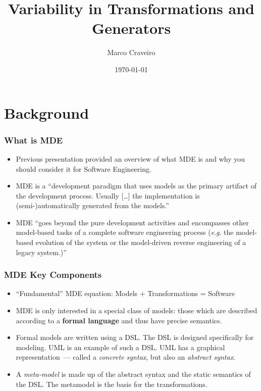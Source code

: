 \documentclass{beamer}
\title{Variability in Transformations and Generators}
\author{Marco Craveiro}
\date{\today}
\newcommand{\eg}{\textit{e}.\textit{g}. }
\begin{document}

\section{Background}

\begin{frame}
\frametitle{What is \ac{MDE}}

\begin{itemize}
\item Previous presentation provided an overview of what \ac{MDE} is
  and why you should consider it for Software Engineering.

\pause

\item \ac{MDE} is a ``development paradigm that uses models as the
  primary artifact of the development process. Usually [\ldots] the
  implementation is (semi-)automatically generated from the
  models.''\cite{brambilla2012model}

\pause

\item \ac{MDE} ``goes beyond the pure development activities and
  encompasses other model-based tasks of a complete software
  engineering process (\eg the model-based evolution of the system or
  the model-driven reverse engineering of a legacy
  system.)''\cite{brambilla2012model}

\end{itemize}

\end{frame}

\begin{frame}
\frametitle{\ac{MDE} Key Components}

\begin{itemize}

\item ``Fundamental'' \ac{MDE} equation: Models + Transformations =
  Software

\pause

\item \ac{MDE} is only interested in a special class of models: those
  which are described according to a \textbf{formal language} and thus
  have precise semantics.

\pause

\item Formal models are written using a \ac{DSL}. The \ac{DSL} is
  designed specifically for modeling. \ac{UML} is an example of such a
  \ac{DSL}. \ac{UML} has a graphical representation~--- called a
  \emph{concrete syntax}, but also an \emph{abstract syntax}.

\pause

\item A \emph{meta-model} is made up of the abstract syntax and the
  static semantics of the \ac{DSL}. The metamodel is the basis for the
  transformations.

\end{itemize}

\end{frame}
\end{document}
